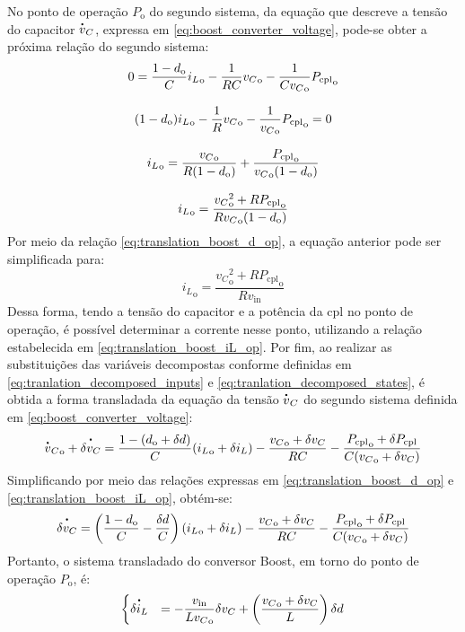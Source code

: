 No ponto de operação $P_{\mathrm{o}}$ do segundo sistema, da equação que descreve a tensão do capacitor $\dt{v}_C$, expressa em \eqref{eq:boost_converter_voltage}, pode-se obter a próxima relação do segundo sistema: \begin{gather}
  0 = \frac{1 - d_{\mathrm{o}}}{C} {i_L}_{\mathrm{o}} - \frac{1}{RC}{v_C}_{\mathrm{o}} - \frac{1}{C{v_C}_{\mathrm{o}}}{P_{\mathrm{cpl}}}_{\mathrm{o}} \notag \\[8pt]
  (1 - d_{\mathrm{o}}){i_L}_{\mathrm{o}} - \frac{1}{R}{v_C}_{\mathrm{o}} - \frac{1}{{v_C}_{\mathrm{o}}}{P_{\mathrm{cpl}}}_{\mathrm{o}} = 0 \notag \\[8pt]
  {i_L}_{\mathrm{o}} = \frac{{v_C}_{\mathrm{o}}}{R(1-d_{\mathrm{o}})} + \frac{{P_{\mathrm{cpl}}}_{\mathrm{o}}}{{v_C}_{\mathrm{o}} (1 - d_{\mathrm{o}})} \notag \\[8pt]
  {i_L}_{\mathrm{o}} = \frac{{v_C}^2_{\mathrm{o}} + R{P_{\mathrm{cpl}}}_{\mathrm{o}}}{R{v_C}_{\mathrm{o}}(1 - d_{\mathrm{o}})}
\end{gather} Por meio da relação \eqref{eq:translation_boost_d_op}, a equação anterior pode ser simplificada para: \begin{equation}
  {i_L}_{\mathrm{o}} = \frac{{v_C}^2_{\mathrm{o}} + R{P_{\mathrm{cpl}}}_{\mathrm{o}}}{R{v_{\mathrm{in}}}}
  \label{eq:translation_boost_iL_op}
\end{equation} Dessa forma, tendo a tensão do capacitor e a potência da \acrshort{cpl} no ponto de operação, é possível determinar a corrente nesse ponto, utilizando a relação estabelecida em \eqref{eq:translation_boost_iL_op}. Por fim, ao realizar as substituições das variáveis decompostas conforme definidas em \eqref{eq:tranlation_decomposed_inputs} e \eqref{eq:tranlation_decomposed_states}, é obtida a forma transladada da equação da tensão $\dt{v}_C$ do segundo sistema definida em \eqref{eq:boost_converter_voltage}: \begin{gather}
  {{\dt{v}_C}}_{\mathrm{o}} + \dt{\delta {v}_C} = \frac{1 - (d_{\mathrm{o}} + \delta d)}{C} ( {i_L}_{\mathrm{o}} + \delta i_L) - \frac{{v_C}_{\mathrm{o}} + \delta v_C}{RC} - \frac{{{P_{\mathrm{cpl}}}_{\mathrm{o}} + \delta P_{\mathrm{cpl}}}}{C({v_C}_{\mathrm{o}} + \delta {v_C})}
\end{gather} Simplificando por meio das relações expressas em \eqref{eq:translation_boost_d_op} e \eqref{eq:translation_boost_iL_op}, obtém-se: \begin{gather}
  \dt{\delta {v}_C} = \left( \frac{1 - d_{\mathrm{o}}}{C} - \frac{\delta d}{C} \right)\left({i_L}_{\mathrm{o}} + \delta i_L\right) - \frac{{v_C}_{\mathrm{o}} + \delta v_C}{RC} - \frac{{{P_{\mathrm{cpl}}}_{\mathrm{o}} + \delta P_{\mathrm{cpl}}}}{C({v_C}_{\mathrm{o}} + \delta {v_C})}
\end{gather} Portanto, o sistema transladado do conversor Boost, em torno do ponto de operação $P_{\mathrm{o}}$, é: \begin{equation}
  \begin{cases}
    \dt{\delta i_L}  &= \displaystyle - \frac{v_{\mathrm{in}}}{L{v_C}_{\mathrm{o}}}\delta v_C + \left(\frac{{v_C}_{\mathrm{o}} + \delta {v_C}}{L}\right) \delta d
    

\end{cases}
\end{equation}
